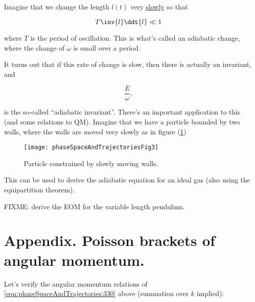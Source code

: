 Imagine that we change the length $l(t)$ very \underline{slowly} so that

\begin{equation}\label{eqn:phaseSpaceAndTrajectories:370}
T \inv{l} \ddt{l} \ll 1
\end{equation}

where $T$ is the period of oscillation.  This is what's called an adiabatic change, where the change of $\omega$ is small over a period.

It turns out that if this rate of change is slow, then there is actually an invariant, and

\begin{equation}\label{eqn:phaseSpaceAndTrajectories:390}
\frac{E}{\omega},
\end{equation}

is the so-called ``adiabatic invariant''.  There's an important application to this (and some relations to QM).  Imagine that we have a particle bounded by two walls, where the walls are moved very slowly as in figure (\ref{fig:phaseSpaceAndTrajectories:phaseSpaceAndTrajectoriesFig3})
\begin{figure}[htp]
   \centering
   \texttt{[image: phaseSpaceAndTrajectoriesFig3]}
   \caption{Particle constrained by slowly moving walls.}\label{fig:phaseSpaceAndTrajectories:phaseSpaceAndTrajectoriesFig3}
\end{figure}

This can be used to derive the adiabatic equation for an ideal gas (also using the equipartition theorem).

FIXME: derive the EOM for the variable length pendulum.

\section{Appendix.  Poisson brackets of angular momentum.}

Let's verify the angular momentum relations of \ref{eqn:phaseSpaceAndTrajectories:330} above (summation over $k$ implied):

